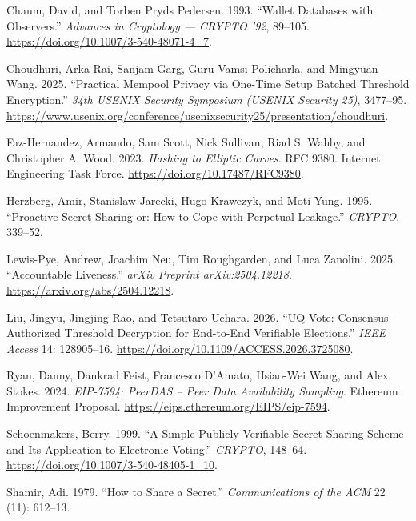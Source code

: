 \documentclass[
]{article}
\newlength{\cslhangindent}
\newenvironment{CSLReferences}[2] %
 {\begin{list}{}{%
  \setlength{\itemindent}{0pt}
  \setlength{\leftmargin}{0pt}
  \setlength{\parsep}{0pt}
  \ifodd #1
   \setlength{\leftmargin}{\cslhangindent}
   \setlength{\itemindent}{-1\cslhangindent}
  \fi
  \setlength{\itemsep}{#2\baselineskip}}}
 {\end{list}}
\begin{document}
\begin{CSLReferences}{1}{1}
Chaum, David, and Torben Pryds Pedersen. 1993. {``Wallet Databases with
Observers.''} \emph{Advances in Cryptology --- {CRYPTO} '92}, 89--105.
\url{https://doi.org/10.1007/3-540-48071-4_7}.

Choudhuri, Arka Rai, Sanjam Garg, Guru Vamsi Policharla, and Mingyuan
Wang. 2025. {``Practical Mempool Privacy via One-Time Setup Batched
Threshold Encryption.''} \emph{34th {USENIX} Security Symposium
({USENIX} Security 25)}, 3477--95.
\url{https://www.usenix.org/conference/usenixsecurity25/presentation/choudhuri}.

Faz-Hernandez, Armando, Sam Scott, Nick Sullivan, Riad S. Wahby, and
Christopher A. Wood. 2023. \emph{Hashing to Elliptic Curves}. RFC 9380.
Internet Engineering Task Force. \url{https://doi.org/10.17487/RFC9380}.

Herzberg, Amir, Stanislaw Jarecki, Hugo Krawczyk, and Moti Yung. 1995.
{``Proactive Secret Sharing or: How to Cope with Perpetual Leakage.''}
\emph{CRYPTO}, 339--52.

Lewis-Pye, Andrew, Joachim Neu, Tim Roughgarden, and Luca Zanolini.
2025. {``Accountable Liveness.''} \emph{arXiv Preprint
arXiv:2504.12218}. \url{https://arxiv.org/abs/2504.12218}.

Liu, Jingyu, Jingjing Rao, and Tetsutaro Uehara. 2026. {``{UQ-Vote}:
Consensus-Authorized Threshold Decryption for End-to-End Verifiable
Elections.''} \emph{IEEE Access} 14: 128905--16.
\url{https://doi.org/10.1109/ACCESS.2026.3725080}.

Ryan, Danny, Dankrad Feist, Francesco D'Amato, Hsiao-Wei Wang, and Alex
Stokes. 2024. \emph{{EIP-7594: PeerDAS -- Peer Data Availability
Sampling}}. Ethereum Improvement Proposal.
\url{https://eips.ethereum.org/EIPS/eip-7594}.

Schoenmakers, Berry. 1999. {``A Simple Publicly Verifiable Secret
Sharing Scheme and Its Application to Electronic Voting.''}
\emph{CRYPTO}, 148--64. \url{https://doi.org/10.1007/3-540-48405-1_10}.

Shamir, Adi. 1979. {``How to Share a Secret.''} \emph{Communications of
the ACM} 22 (11): 612--13.


\end{CSLReferences}
\end{document}
